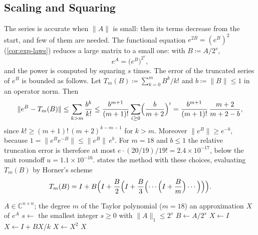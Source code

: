 \subsection{Scaling and Squaring}

The series is accurate when $\|A\|$ is small: then its terms decrease from the start, and few of them are needed. The functional equation $e^{2B}=(e^B)^2$ (\cref{cor:exp-laws}) reduces a large matrix to a small one: with $B\coloneqq A/2^s$,
\[
e^A=\bigl(e^{B}\bigr)^{2^s},
\]
and the power is computed by squaring $s$ times. The error of the truncated series of $e^B$ is bounded as follows. Let $T_m(B)\coloneqq\sum_{k=0}^mB^k/k!$ and $b\coloneqq\|B\|\le1$ in an operator norm. Then
\[
\|e^B-T_m(B)\|\le\sum_{k>m}\frac{b^k}{k!}\le\frac{b^{m+1}}{(m+1)!}\sum_{i\ge0}\Bigl(\frac b{m+2}\Bigr)^i=\frac{b^{m+1}}{(m+1)!}\,\frac{m+2}{m+2-b},
\]
since $k!\ge(m+1)!\,(m+2)^{k-m-1}$ for $k>m$. Moreover $\|e^B\|\ge e^{-b}$, because $1=\|e^Be^{-B}\|\le\|e^B\|\,e^{b}$. For $m=18$ and $b\le1$ the relative truncation error is therefore at most $e\cdot(20/19)/19!=2.4\times10^{-17}$, below the unit roundoff $u=1.1\times10^{-16}$.  states the method with these choices, evaluating $T_m(B)$ by Horner's scheme
\[
T_m(B)=I+B\Bigl(I+\frac B2\Bigl(I+\frac B3\Bigl(\cdots\Bigl(I+\frac Bm\Bigr)\cdots\Bigr)\Bigr)\Bigr).
\]

\begin{algorithm}
\begin{algorithmic}[1]
\Require $A\in\mathbb C^{n\times n}$; the degree $m$ of the Taylor polynomial ($m=18$)
\Ensure an approximation $X$ of $e^A$
\State $s\gets$ the smallest integer $s\ge0$ with $\|A\|_1\le2^s$ 
\State $B\gets A/2^s$
\State $X\gets I$
  \State $X\gets I+BX/k$ 
\EndFor
{}
  \State $X\gets X^2$ 
\EndFor
\State \Return $X$
\end{algorithmic}
\caption{The exponential by scaling and squaring with a Taylor polynomial. The cost is $m+s$ matrix products; the truncation error of the Taylor polynomial is below the unit roundoff, and the rounding errors of the squarings are not bounded by this simple analysis.\label{alg:scaling-squaring}}
\end{algorithm}

